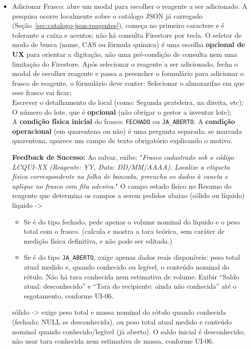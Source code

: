 \begin{itemize}
\begin{itemize}
        \item Adicionar Frasco: abre um modal para escolher o reagente a ser adicionado. A pesquisa ocorre localmente sobre o catálogo JSON já carregado (Seção~\ref{sec:catalogo-json-reagentes}), começa no primeiro caractere e é tolerante a caixa e acentos; não há consulta Firestore por tecla. O seletor de modo de busca (nome, CAS ou fórmula química) é uma escolha \textbf{opcional de UX} para orientar a digitação, não uma pré-condição de consulta nem uma limitação do Firestore. Após selecionar o reagente a ser adicionado, fecha o modal de escolher reagente e passa a preencher o formulário para adicionar o frasco de reagente, o fórmulário deve conter:
         Selecionar o almoxarifao em que esse frasco vai ficar;\\
         Escrever o detalhamento do local (como: Segunda prateleira, na direita, etc);\\
         O número do lote, que é \textbf{opcional} (não obrigar o gestor a inventar lote);\\
         A \textbf{condição física inicial} do frasco: \texttt{FECHADO} ou \texttt{JA\_ABERTO}. A \textbf{condição operacional} (em quarentena ou não) é uma pergunta separada: se marcada quarentena, aparece um campo de texto obrigatório explicando o motivo.

         \textbf{Feedback de Sucesso:} Ao salvar, exibe: "\textit{Frasco cadastrado sob o código LCQUI-XX (Reagente: YY, Data: DD/MM/AAAA). Localize a etiqueta física correspondente na folha de bancada, preencha os dados à caneta e aplique no frasco com fita adesiva.}"
         O campo estado físico no Resumo do reagente que determina os campos a serem pedidos abaixo (sólido ou líquido) \\
        líquido ->
        \begin{itemize}
    \item Se é do tipo fechado, pede apenas o volume nominal do líquido e o peso total com o frasco. (calcula e mostra a tara teórica, sem caráter de medição física definitiva, e não pode ser editada.)
    \item Se é do tipo \texttt{JA\_ABERTO}, exige apenas dados reais disponíveis: peso total atual medido e, quando conhecido ou legível, o conteúdo nominal do rótulo. Não há tara conhecida nem estimativa de volume. Exibir ``Saldo atual: desconhecido'' e ``Tara do recipiente: ainda não conhecida'' até o esgotamento, conforme UI-06.
        \end{itemize}
        sólido -> exige peso total e massa nominal do rótulo quando conhecida (fechado; NULL se desconhecida), ou peso total atual medido e conteúdo nominal quando conhecido/legível (já aberto). O saldo inicial é desconhecido; não usar tara conhecida nem estimativa de massa, conforme UI-06.


\end{itemize}
\end{itemize}
